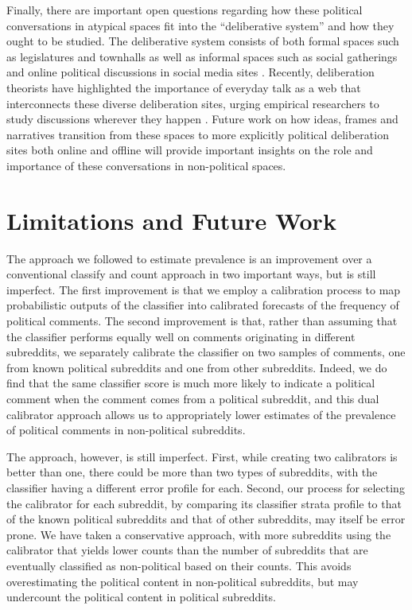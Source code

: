 \documentclass[letterpaper]{article} %
\begin{document}
Finally, there are important open questions regarding how these political conversations in atypical spaces fit into the  ``deliberative system'' and how they ought to be studied. The deliberative system consists of both formal spaces such as legislatures and townhalls as well as informal spaces such as social gatherings and online political discussions in social media sites \cite{parkinson2012deliberative}. Recently, deliberation  theorists have highlighted the importance of everyday talk as a web that interconnects these diverse deliberation sites, urging empirical researchers to study discussions wherever they happen \cite{mansbridge1999everyday,conover2018taking}. Future work on how ideas, frames and narratives transition from these spaces to more explicitly political deliberation sites both online and offline will provide important insights on the role and importance of these conversations in non-political spaces.



\section{Limitations and Future Work}

The approach we followed to estimate prevalence is an improvement over a conventional classify and count approach in two important ways, but is still imperfect. The first improvement is that we employ a calibration process to map probabilistic outputs of the classifier into calibrated forecasts of the frequency of political comments. The second improvement is that, rather than assuming that the classifier performs equally well on comments originating in different subreddits, we separately calibrate the classifier on two samples of comments, one from known political subreddits and one from other subreddits. Indeed, we do find that the same classifier score is much more likely to indicate a political comment when the comment comes from a political subreddit, and this dual calibrator approach allows us to appropriately lower estimates of the prevalence of political comments in non-political subreddits.

The approach, however, is still imperfect. First, while creating two calibrators is better than one, there could be more than two types of subreddits, with the classifier having a different error profile for each. Second, our process for selecting the calibrator for each subreddit, by comparing its classifier strata profile to that of the known political subreddits and that of other subreddits, may itself be error prone. We have taken a conservative approach, with more subreddits using the calibrator that yields lower counts than the number of subreddits that are eventually classified as non-political based on their counts. This avoids overestimating the political content in non-political subreddits, but may undercount the political content in political subreddits. 
\end{document}
